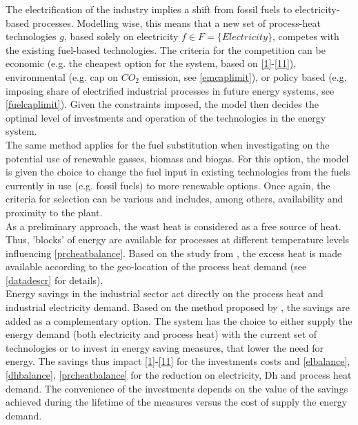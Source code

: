 \documentclass[review]{elsarticle}
\begin{document}
The electrification of the industry implies a shift from fossil fuels to electricity-based processes. Modelling wise, this means that a new set of process-heat technologies $g$, based solely on electricity $f \in F=\{Electricity\}$, competes with the existing fuel-based technologies. The criteria for the competition can be economic (e.g. the cheapest option for the system, based on \autoref{1}-\autoref{11}), environmental (e.g. cap on $CO_2$ emission, see \autoref{emcaplimit}), or policy based (e.g. imposing share of electrified industrial processes in future energy systems, see \autoref{fuelcaplimit}). Given the constraints imposed, the model then decides the optimal level of investments and operation of the technologies in the energy system.\\ 
The same method applies for the fuel substitution when investigating on the potential use of renewable gasses, biomass and biogas. For this option, the model is given the choice to change the fuel input in existing technologies from the fuels currently in use (e.g. fossil fuels) to more renewable options. Once again, the criteria for selection can be various and includes, among others, availability and proximity to the plant.\\
As a preliminary approach, the wast heat is considered as a free source of heat. Thus, 'blocks' of energy are available for processes at different temperature levels influencing \autoref{prcheatbalance}. Based on the study from \cite{Buhler2017a,Buhler2017}, the excess heat is made available according to the geo-location of the process heat demand (see \autoref{datadescr} for details). \\
Energy savings in the industrial sector act directly on the process heat and industrial electricity demand. Based on the method proposed by \cite{Baldini2016a}, the savings are added as a complementary option. The system has the choice to either supply the energy demand (both electricity and process heat) with the current set of technologies or to invest in energy saving measures, that lower the need for energy. The savings thus impact \autoref{1}-\autoref{11} for the investments costs and \autoref{elbalance}, \autoref{dhbalance}, \autoref{prcheatbalance} for the reduction on electricity, Dh and process heat demand.
The convenience of the investments depends on the value of the savings achieved during the lifetime of the measures versus the cost of supply the energy demand. 


\end{document}
